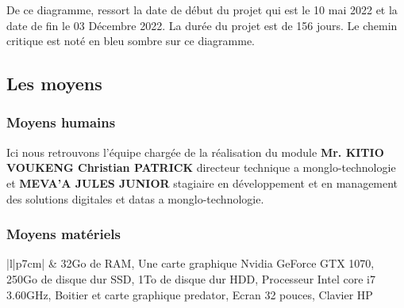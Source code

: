 De ce diagramme, ressort la date de début du projet qui est le 10 mai 2022 et la date de fin le 03 Décembre 2022. La durée du projet est de 156 jours. Le chemin critique est noté en bleu sombre sur ce diagramme.

\subsection{Les moyens}

\subsubsection{Moyens humains}

Ici nous retrouvons l'équipe chargée de la réalisation du module \textbf{Mr. KITIO VOUKENG Christian PATRICK} directeur technique a monglo-technologie et \textbf{MEVA’A JULES JUNIOR} stagiaire en développement et en management des solutions digitales et datas a monglo-technologie.

\subsubsection{Moyens matériels}

\begin{table}[H]
	\centering
	\caption{Moyens matériels}
	\label{tab:my-table}
	\begin{tabular}{|l|p{7cm}|}
		\hline
		 & 32Go de RAM, Une carte graphique Nvidia GeForce GTX 1070, 250Go de disque dur SSD, 1To de disque dur HDD, Processeur Intel core i7 3.60GHz, Boitier et carte graphique predator, Ecran 32 pouces, Clavier HP \\ \hline
		                                                                                                                                                                                                         \\ \hline
		                                                                                                                                                                                                                      \\ \hline
		                                                                                                                                                                                                                      \\ \hline
	\end{tabular}
\end{table}

